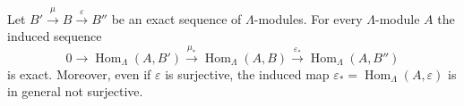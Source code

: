 Let $B' \xrightarrow{\mu} B \xrightarrow{\varepsilon} B''$ be an exact sequence of $\Lambda$-modules. For every $\Lambda$-module $A$ the induced sequence
$$
0 \longrightarrow \operatorname{Hom}_{\Lambda}(A, B') \xrightarrow{\mu_{*}} \operatorname{Hom}_{\Lambda}(A, B) \xrightarrow{\varepsilon_{*}} \operatorname{Hom}_{\Lambda}(A, B'')
$$
is exact. Moreover, even if $\varepsilon$ is surjective, the induced map $\varepsilon_{*} = \operatorname{Hom}_{\Lambda}(A, \varepsilon)$ is in general not surjective.
